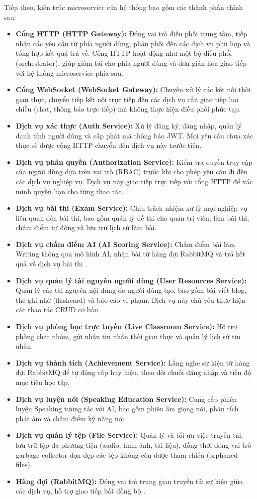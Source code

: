Tiếp theo, kiến trúc microservice của hệ thống bao gồm các thành phần chính sau:
\begin{itemize}
  \item \textbf{Cổng HTTP (HTTP Gateway):} Đóng vai trò điều phối trung tâm, tiếp nhận các yêu cầu từ phía người dùng, phân phối đến các dịch vụ phù hợp và tổng hợp kết quả trả về. Cổng HTTP hoạt động như một bộ điều phối (orchestrator), giúp giảm tải cho phía người dùng và đơn giản hóa giao tiếp với hệ thống microservice phía sau.
  \item \textbf{Cổng WebSocket (WebSocket Gateway):} Chuyên xử lý các kết nối thời gian thực, chuyển tiếp kết nối trực tiếp đến các dịch vụ cần giao tiếp hai chiều (chat, thông báo trực tiếp) mà không thực hiện điều phối phức tạp.
  \item \textbf{Dịch vụ xác thực (Auth Service):} Xử lý đăng ký, đăng nhập, quản lý danh tính người dùng và cấp phát mã thông báo JWT. Mọi yêu cầu chưa xác thực sẽ được cổng HTTP chuyển đến dịch vụ này trước tiên.
  \item \textbf{Dịch vụ phân quyền (Authorization Service):} Kiểm tra quyền truy cập của người dùng dựa trên vai trò (RBAC) trước khi cho phép yêu cầu đi đến các dịch vụ nghiệp vụ. Dịch vụ này giao tiếp trực tiếp với cổng HTTP để xác minh quyền hạn cho từng thao tác.
  \item \textbf{Dịch vụ bài thi (Exam Service):} Chịu trách nhiệm xử lý mọi nghiệp vụ liên quan đến bài thi, bao gồm quản lý đề thi cho quản trị viên, làm bài thi, chấm điểm tự động và lưu trữ lịch sử làm bài.
  \item \textbf{Dịch vụ chấm điểm AI (AI Scoring Service):} Chấm điểm bài làm Writing thông qua mô hình AI, nhận bài từ hàng đợi RabbitMQ và trả kết quả về dịch vụ bài thi \cite{rabbitmq_docs}.
  \item \textbf{Dịch vụ quản lý tài nguyên người dùng (User Resources Service):} Quản lý các tài nguyên nội dung do người dùng tạo, bao gồm bài viết blog, thẻ ghi nhớ (flashcard) và báo cáo vi phạm. Dịch vụ này chủ yếu thực hiện các thao tác CRUD cơ bản.
  \item \textbf{Dịch vụ phòng học trực tuyến (Live Classroom Service):} Hỗ trợ phòng chat nhóm, gửi nhận tin nhắn thời gian thực và quản lý lịch sử tin nhắn.
  \item \textbf{Dịch vụ thành tích (Achievement Service):} Lắng nghe sự kiện từ hàng đợi RabbitMQ để tự động cấp huy hiệu, theo dõi chuỗi đăng nhập và tiến độ mục tiêu học tập.
  \item \textbf{Dịch vụ luyện nói (Speaking Education Service):} Cung cấp phiên luyện Speaking tương tác với AI, bao gồm phiên âm giọng nói, phân tích phát âm và chấm điểm kỹ năng nói.
  \item \textbf{Dịch vụ quản lý tệp (File Service):} Quản lý và tối ưu việc truyền tải, lưu trữ tệp đa phương tiện (audio, hình ảnh, tài liệu), đồng thời đóng vai trò garbage collector dọn dẹp các tệp không còn được tham chiếu (orphaned files).
  \item \textbf{Hàng đợi (RabbitMQ):} Đóng vai trò trung gian truyền tải sự kiện giữa các dịch vụ, hỗ trợ giao tiếp bất đồng bộ \cite{rabbitmq_docs}.
\end{itemize}

